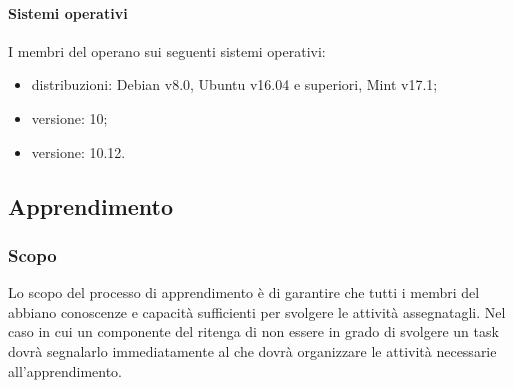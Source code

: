         \paragraph{Sistemi operativi}
        I membri del  operano sui seguenti sistemi operativi:
        \begin{itemize}
            \item {} distribuzioni: Debian v8.0, Ubuntu v16.04 e superiori, Mint v17.1;
            \item {} versione: 10;
            \item {} versione: 10.12.
        \end{itemize}

    \subsection{Apprendimento}
        \subsubsection{Scopo}
        Lo scopo del processo di apprendimento è di garantire che tutti i membri del  abbiano conoscenze e capacità sufficienti per svolgere le attività assegnatagli. Nel caso in cui un componente del  ritenga di non essere in grado di svolgere un task dovrà segnalarlo immediatamente al \responsabilediprogetto{} che dovrà organizzare le attività necessarie all'apprendimento.
